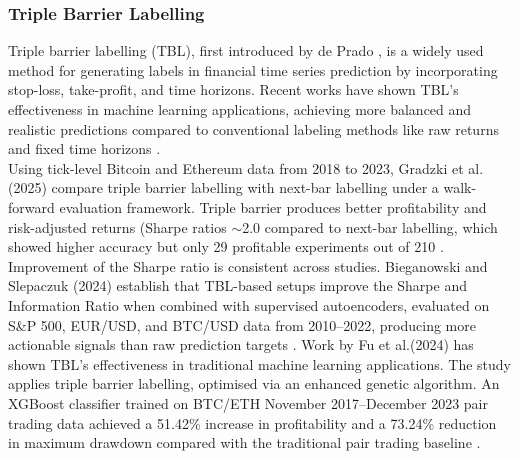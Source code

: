 \subsubsection{Triple Barrier Labelling}
Triple barrier labelling (TBL), first introduced by de Prado \cite{lopezdepradoAdvancesFinancialMachine2018}, is a widely used method for generating labels in financial time series prediction by incorporating stop-loss, take-profit, and time horizons. Recent works have shown TBL's effectiveness in machine learning applications, achieving more balanced and realistic predictions compared to conventional labeling methods like raw returns and fixed time horizons \cite{liModelOptimizationStock2022}.\\
Using tick-level Bitcoin and Ethereum data from 2018 to 2023, Gradzki et al. (2025) compare triple barrier labelling with next-bar labelling under a walk-forward evaluation framework. Triple barrier produces better profitability and risk-adjusted returns (Sharpe ratios $\sim$2.0 compared to next-bar labelling, which showed higher accuracy but only 29 profitable experiments out of 210 \cite{gradzkiAlgorithmicCryptoTrading2025}.
Improvement of the Sharpe ratio is consistent across studies. Bieganowski and Slepaczuk (2024) establish that TBL-based setups improve the Sharpe and Information Ratio when combined with supervised autoencoders, evaluated on S\&P 500, EUR/USD, and BTC/USD data from 2010–2022, producing more actionable signals than raw prediction targets \cite{bieganowskiSupervisedAutoencoderMLP2024}.
Work by Fu et al.(2024) has shown TBL’s effectiveness in traditional machine learning applications. The study applies triple barrier labelling, optimised via an enhanced genetic algorithm. An XGBoost classifier trained on BTC/ETH November 2017–December 2023 pair trading data achieved a 51.42\% increase in profitability and a 73.24\% reduction in maximum drawdown compared with the traditional pair trading baseline \cite{fuEnhancedGeneticAlgorithmDrivenTriple2024}.
